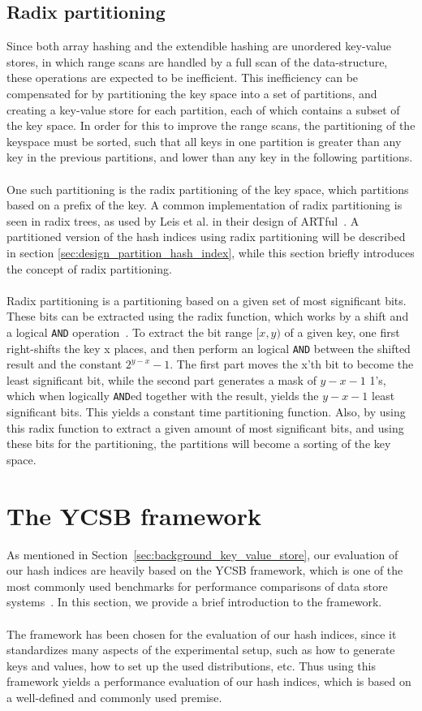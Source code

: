 \documentclass[11pt]{report} %
\begin{document}
\subsection{Radix partitioning}
\label{subsec:background_radix_partitioning}
Since both array hashing and the extendible hashing are unordered key-value stores, in which range scans are handled by a full scan of the data-structure, these operations are expected to be inefficient. This inefficiency can be compensated for by partitioning the key space into a set of partitions, and creating a key-value store for each partition, each of which contains a subset of the key space. In order for this to improve the range scans, the partitioning of the keyspace must be sorted, such that all keys in one partition is greater than any key in the previous partitions, and lower than any key in the following partitions. \\
\\
One such partitioning is the radix partitioning of the key space, which partitions based on a prefix of the key. A common implementation of radix partitioning is seen in radix trees, as used by Leis et al. in their design of ARTful~\cite{ARTful}. A partitioned version of the hash indices using radix partitioning will be described in section \ref{sec:design_partition_hash_index}, while this section briefly introduces the concept of radix partitioning.\\
\\
Radix partitioning is a partitioning based on a given set of most significant bits. These bits can be extracted using the radix function, which works by a shift and a logical \verb|AND| operation~\cite{radix}. To extract the bit range $[x, y)$ of a given key, one first right-shifts the key x places, and then perform an logical \verb|AND| between the shifted result and the constant $2^{y-x}-1$. The first part moves the x'th bit to become the least significant bit, while the second part generates a mask of $y-x-1$ 1's, which when logically \verb|AND|ed together with the result, yields the $y-x-1$ least significant bits. This yields a constant time partitioning function. Also, by using this radix function to extract a given amount of most significant bits, and using these bits for the partitioning, the partitions will become a sorting of the key space.
\section{The YCSB framework}
\label{sec:background_ycsb}
As mentioned in Section~\ref{sec:background_key_value_store}, our evaluation of our hash indices are heavily based on the YCSB framework, which is one of the most commonly used benchmarks for performance comparisons of data store systems~\cite{BC10}. In this section, we provide a brief introduction to the framework.\\
\\
The framework has been chosen for the evaluation of our hash indices, since it standardizes many aspects of the experimental setup, such as how to generate keys and values, how to set up the used distributions, etc. Thus using this framework yields a performance evaluation of our hash indices, which is based on a well-defined and commonly used premise.
\end{document}
